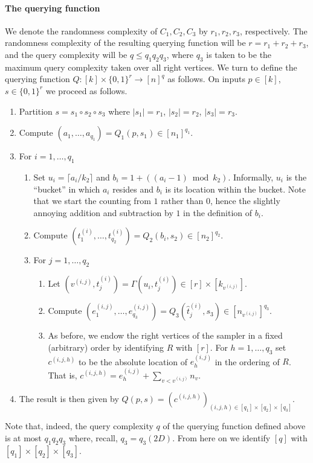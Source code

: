 \paragraph{The querying function}
We denote the randomness complexity of $C_1,C_2,C_3$ by $r_1,r_2,r_3$, respectively. The randomness complexity of the resulting querying function will be $r=r_1+r_2+r_3$, and the query complexity will be $q\leq q_1q_2q_3$, where $q_3$ is taken to be the maximum query complexity taken over all right vertices. We turn to define the querying function $Q:[k]\times\{0,1\}^r\to[n]^q$ as follows. On inputs $p\in[k]$, $s\in\{0,1\}^r$ we proceed as follows.
\begin{enumerate}
\item Partition $s=s_1\circ s_2\circ s_3$ where $|s_1|=r_1$, $|s_2|=r_2$, $|s_3|=r_3$.
\item Compute $(a_1,\ldots,a_{q_1})=Q_1(p,s_1)\in[n_1]^{q_1}$.
\item For $i=1,\ldots,q_1$
\begin{enumerate}
\item Set $u_i=\lceil a_i/k_2\rceil$ and $b_i=1+((a_i-1)\bmod k_2)$. Informally, $u_i$ is the ``bucket'' in which $a_i$ resides and $b_i$ is its location within the bucket. Note that we start the counting from $1$ rather than $0$, hence the slightly annoying addition and subtraction by $1$ in the definition of $b_i$.
\item Compute $(t_1^{(i)},\ldots,t_{q_2}^{(i)})=Q_2(b_i,s_2)\in[n_2]^{q_2}$.
\item For $j=1,\ldots,q_2$
\begin{enumerate}
\item Let $(v^{(i,j)},\widehat t_j^{(i)})=\Gamma(u_i,t_j^{(i)})\in[r]\times[k_{v^{(i,j)}}]$.
\item Compute $(e_1^{(i,j)},\ldots,e_{q_3}^{(i,j)})=Q_3(\widehat t_j^{(i)},s_3)\in[n_{v^{(i,j)}}]^{q_3}$.
\item As before, we endow the right vertices of the sampler in a fixed (arbitrary) order by identifying $R$ with $[r]$. For $h=1,\ldots,q_3$ set $c^{(i,j,h)}$ to be the absolute location of $e_h^{(i,j)}$ in the ordering of $R$. That is, $c^{(i,j,h)}=e_h^{(i,j)}+\sum_{v<v^{(i,j)}}n_v$.
\end{enumerate}
\end{enumerate}
\item The result is then given by $Q(p,s)=(c^{(i,j,h)})_{(i,j,h)\in[q_1]\times[q_2]\times[q_3]}$.
\end{enumerate}
Note that, indeed, the query complexity $q$ of the querying function defined above is at most $q_1q_2q_3$ where, recall, $q_3=q_3(2D)$. From here on we identify $[q]$ with $[q_1]\times[q_2]\times[q_3]$.
